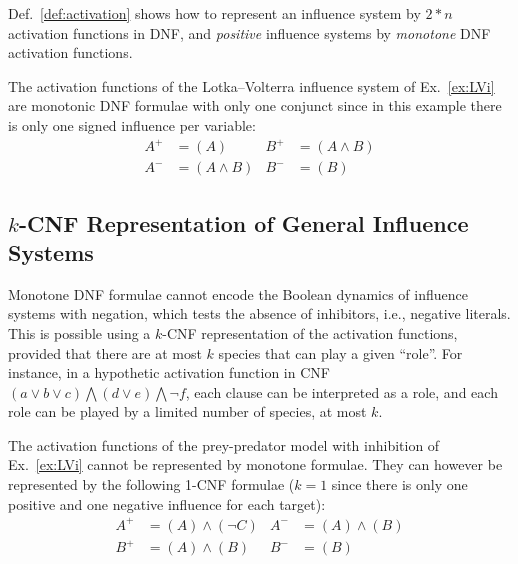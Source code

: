 \documentclass{llncs}
\begin{document}
Def.~\ref{def:activation} shows how to represent an influence system by $2*n$ activation functions in DNF, 
and \emph{positive} influence systems by \emph{monotone} DNF activation functions.

\begin{example}
The activation functions of the Lotka--Volterra influence system of Ex.~\ref{ex:LVi}
are monotonic DNF formulae with only one conjunct since in this example there is only one signed influence per variable:
\begin{align*}
   A^+&=(A)& B^+&=(A\wedge B)\\
   A^-&=(A \wedge B)& B^-&=(B)
\end{align*}

\end{example}


\subsection{$k$-CNF Representation of General Influence Systems}
\label{sec:kcnf}

Monotone DNF formulae cannot encode the Boolean dynamics of influence systems with negation,
which tests the absence of inhibitors, i.e., negative literals.
This is possible using a $k$-CNF representation of the activation functions,
provided that there are at most $k$ species that can play a given ``role''. 
For instance, in a hypothetic activation function in CNF
$
\left(a \vee b \vee c\right) \bigwedge
\left(d \vee e\right) \bigwedge 
\neg f
$,
each clause can be interpreted as a role, and each role can be played by a limited number of species, at most $k$.


\begin{example}
   The activation functions of the prey-predator model with inhibition of Ex.~\ref{ex:LVi} cannot be
   represented by monotone formulae. They can however be represented by the following 1-CNF
   formulae ($k=1$ since there is only one positive and one
   negative influence for each target):
\begin{align*}
   A^+&=(A)\wedge(\neg C)& A^-&=(A) \wedge (B)\\
   B^+&=(A)\wedge (B)& B^-&=(B)
\end{align*}

\end{example}
\end{document}
